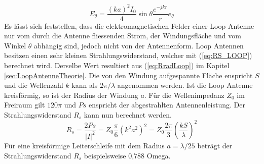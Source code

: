 \begin{equation}
E_{\theta}=\dfrac{(ka)^2I_{0}}{4}\sin \theta \dfrac{e^{-jkr}}{r} e_{\theta}
\end{equation}
Es lässt sich feststellen, dass die elektromagnetischen Felder einer Loop Antenne nur vom durch die Antenne fliessenden Strom, der Windungsfläche und vom Winkel $\theta$ abhängig sind, jedoch nicht von der Antennenform. Loop Antennen besitzen einen sehr kleinen Strahlungswiderstand, welcher mit (\ref{eq:RS_LOOP}) berechnet wird. Derselbe Wert resultiert aus (\ref{eq:RradLoop}) im Kapitel \ref{sec:LoopAntenneTheorie}. Die von den Windung aufgespannte Fläche enspricht $S$ und die Wellenzahl $k$ kann als $2\pi/\lambda$ angenommen werden. Ist die Loop Antenne kreisförmig, so ist der Radius der Windung $a$. Für die Wellenimpedanz $Z_0$ im Freiraum gilt $120\pi$ und $Ps$ enspricht der abgestrahlten Antennenleistung. Der Strahlungswiderstand $R_s$ kann nun berechnet werden.
\begin{equation}\label{eq:RS_LOOP}
R_{s}=\dfrac{2Ps}{|I|^{2}}=Z_{0}\dfrac{\pi}{6}(k^{2}a^{2})^{2}=Z_{0}\dfrac{2\pi}{3}\left(\dfrac{kS}{\lambda}\right)^{2} 
\end{equation}
Für eine kreisförmige Leiterschleife mit dem Radius $a = \lambda/25$ beträgt der Strahlungswiderstand $R_{s}$ beispielsweise  0,788 Omega.


